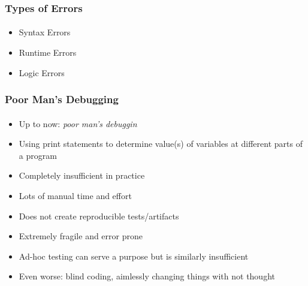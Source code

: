 \documentclass[]{beamer}
\begin{document}
\begin{frame}[fragile]
    \frametitle{Types of Errors}
    \framesubtitle{}

\begin{itemize}[<+->]
  \item Syntax Errors
  \item Runtime Errors
  \item Logic Errors
\end{itemize}
    
\end{frame}

\begin{frame}[fragile]
    \frametitle{Poor Man's Debugging}
    \framesubtitle{}

\begin{itemize}[<+->]
  \item Up to now: \emph{poor man's debuggin}
  \item Using print statements to determine value(s) of variables at different parts of a program
  \item Completely insufficient in practice
  \item Lots of manual time and effort
  \item Does not create reproducible tests/artifacts
  \item Extremely fragile and error prone
  \item Ad-hoc testing can serve a purpose but is similarly insufficient
  \item Even worse: blind coding, aimlessly changing things with not thought
\end{itemize}

\end{frame}
\end{document}
